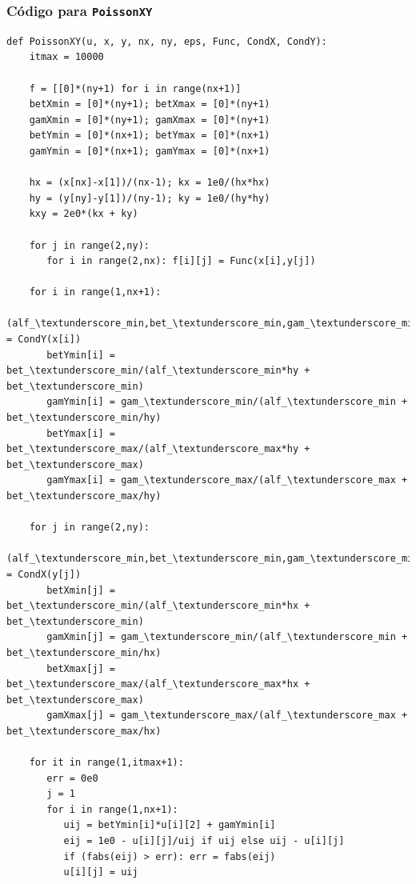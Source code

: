 \begin{frame}
\frametitle{Código para \texttt{PoissonXY}}
\begin{lstlisting}[caption=Código para la función \texttt{PoissonXY}, style=FormattedNumber, basicstyle=\linespread{1.1}\ttfamily=\small, columns=fullflexible]
def PoissonXY(u, x, y, nx, ny, eps, Func, CondX, CondY):
    itmax = 10000
 
    f = [[0]*(ny+1) for i in range(nx+1)]
    betXmin = [0]*(ny+1); betXmax = [0]*(ny+1)
    gamXmin = [0]*(ny+1); gamXmax = [0]*(ny+1)
    betYmin = [0]*(nx+1); betYmax = [0]*(nx+1)
    gamYmin = [0]*(nx+1); gamYmax = [0]*(nx+1)
 
    hx = (x[nx]-x[1])/(nx-1); kx = 1e0/(hx*hx)
    hy = (y[ny]-y[1])/(ny-1); ky = 1e0/(hy*hy) 
    kxy = 2e0*(kx + ky)
 
    for j in range(2,ny):
       for i in range(2,nx): f[i][j] = Func(x[i],y[j])
                                                         
    for i in range(1,nx+1):
       (alf_\textunderscore_min,bet_\textunderscore_min,gam_\textunderscore_min,alf_\textunderscore_max,bet_\textunderscore_max,gam_\textunderscore_max) = CondY(x[i])
       betYmin[i] = bet_\textunderscore_min/(alf_\textunderscore_min*hy + bet_\textunderscore_min)
       gamYmin[i] = gam_\textunderscore_min/(alf_\textunderscore_min + bet_\textunderscore_min/hy)
       betYmax[i] = bet_\textunderscore_max/(alf_\textunderscore_max*hy + bet_\textunderscore_max)
       gamYmax[i] = gam_\textunderscore_max/(alf_\textunderscore_max + bet_\textunderscore_max/hy)
 
    for j in range(2,ny):
       (alf_\textunderscore_min,bet_\textunderscore_min,gam_\textunderscore_min,alf_\textunderscore_max,bet_\textunderscore_max,gam_\textunderscore_max) = CondX(y[j])
       betXmin[j] = bet_\textunderscore_min/(alf_\textunderscore_min*hx + bet_\textunderscore_min)
       gamXmin[j] = gam_\textunderscore_min/(alf_\textunderscore_min + bet_\textunderscore_min/hx)
       betXmax[j] = bet_\textunderscore_max/(alf_\textunderscore_max*hx + bet_\textunderscore_max)
       gamXmax[j] = gam_\textunderscore_max/(alf_\textunderscore_max + bet_\textunderscore_max/hx)
 
    for it in range(1,itmax+1): 
       err = 0e0
       j = 1
       for i in range(1,nx+1):
          uij = betYmin[i]*u[i][2] + gamYmin[i]
          eij = 1e0 - u[i][j]/uij if uij else uij - u[i][j]
          if (fabs(eij) > err): err = fabs(eij)
          u[i][j] = uij
 

\end{lstlisting}
\end{frame}
